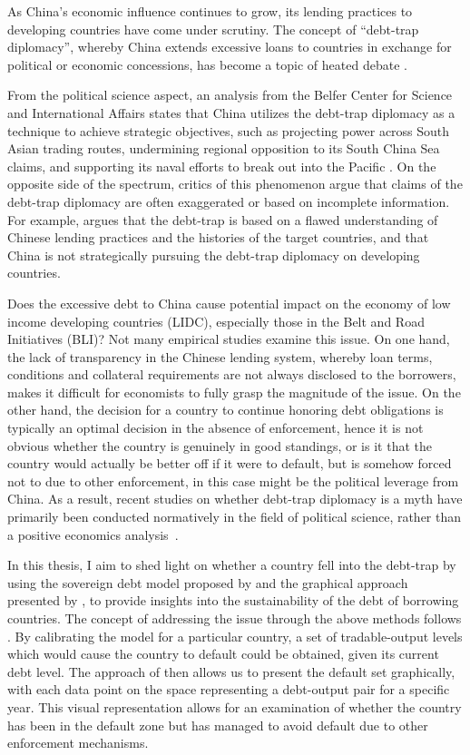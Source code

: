As China's economic influence continues to grow, its lending practices to developing countries have come under scrutiny.
The concept of ``debt-trap diplomacy'', whereby China extends excessive loans to countries in exchange for political or economic concessions, has become a topic of heated debate \citep{Chellaney_2017}.

From the political science aspect, an analysis from the Belfer Center for Science and International Affairs states that China utilizes the debt-trap diplomacy as a technique to achieve strategic objectives, such as projecting power across South Asian trading routes, undermining regional opposition to its South China Sea claims, and supporting its naval efforts to break out into the Pacific \citep*{Parker2018}.
On the opposite side of the spectrum, critics of this phenomenon argue that claims of the debt-trap diplomacy are often exaggerated or based on incomplete information. For example, \citet*{Brautigam-meme-2020} argues that the debt-trap is based on a flawed understanding of Chinese lending practices and the histories of the target countries, and that China is not strategically pursuing the debt-trap diplomacy on developing countries.

Does the excessive debt to China cause potential impact on the economy of low income developing countries (LIDC), especially those in the Belt and Road Initiatives (BLI)? Not many empirical studies examine this issue.
On one hand, the lack of transparency in the Chinese lending system, whereby loan terms, conditions and collateral requirements are not always disclosed to the borrowers, makes it difficult for economists to fully grasp the magnitude of the issue.
On the other hand, the decision for a country to continue honoring debt obligations is typically an optimal decision in the absence of enforcement, hence it is not obvious whether the country is genuinely in good standings, or is it that the country would actually be better off if it were to default, but is somehow forced not to due to other enforcement, in this case might be the political leverage from China.
As a result, recent studies on whether debt-trap diplomacy is a myth have primarily been conducted normatively in the field of political science, rather than a positive economics analysis~\citep[See, e.g.,][]{Himmer2023-vn,Chen2020-eo}.

In this thesis, I aim to shed light on whether a country fell into the debt-trap by using the sovereign debt model proposed by \citet{Na-18} and the graphical approach presented by \citet{Hinrichsen_2020-chapter4}, to provide insights into the sustainability of the debt of borrowing countries.
The concept of addressing the issue through the above methods follows \citet{Ho-23-debt-trap}.
By calibrating the model for a particular country, a set of tradable-output levels which would cause the country to default could be obtained, given its current debt level. The approach of \citet{Hinrichsen_2020-chapter4} then allows us to present the default set graphically, with each data point on the space representing a debt-output pair for a specific year. This visual representation allows for an examination of whether the country has been in the default zone but has managed to avoid default due to other enforcement mechanisms.

